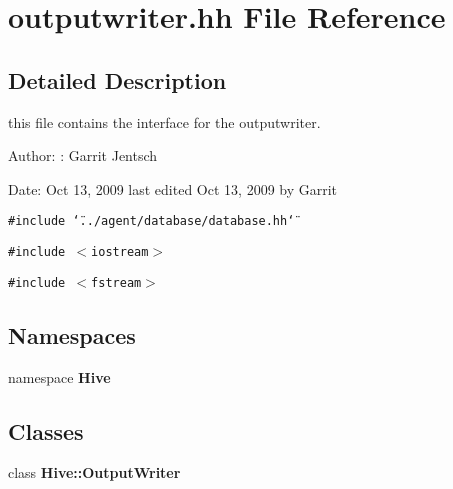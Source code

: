 \section{outputwriter.hh File Reference}
\label{outputwriter_8hh}


\subsection{Detailed Description}
this file contains the interface for the outputwriter.

\begin{Desc}
\item[Author:]: Garrit Jentsch\end{Desc}
\begin{Desc}
\item[Date:]Oct 13, 2009 last edited Oct 13, 2009 by Garrit \end{Desc}


{\tt \#include \char`\"{}../agent/database/database.hh\char`\"{}}\par
{\tt \#include $<$iostream$>$}\par
{\tt \#include $<$fstream$>$}\par
\subsection*{Namespaces}
\begin{CompactItemize}
\item 
namespace {\bf Hive}
\end{CompactItemize}
\subsection*{Classes}
\begin{CompactItemize}
\item 
class {\bf Hive::OutputWriter}
\end{CompactItemize}
